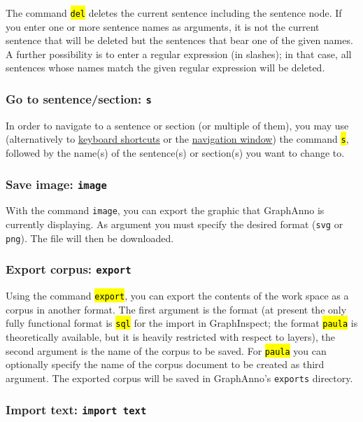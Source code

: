 \documentclass[12pt]{scrartcl}
\newcommand{\code}[1]{\hl{\texttt{#1}}}
\begin{document}
The command \code{del} deletes the current sentence including the sentence node.
If you enter one or more sentence names as arguments, it is not the current sentence that will be deleted but the sentences that bear one of the given names.
A further possibility is to enter a regular expression (in slashes); in that case, all sentences whose names match the given regular expression will be deleted.


\subsubsection{Go to sentence/section: \texttt{s}}\label{befehl-s}

In order to navigate to a sentence or section (or multiple of them), you may use (alternatively to \hyperref[shortcuts]{keyboard shortcuts} or the \hyperref[window-navigation]{navigation window}) the command \code{s}, followed by the name(s) of the sentence(s) or section(s) you want to change to.


\subsubsection{Save image: \texttt{image}}

With the command \texttt{image}, you can export the graphic that GraphAnno is currently displaying.
As argument you must specify the desired format (\texttt{svg} or \texttt{png}).
The file will then be downloaded.


\subsubsection{Export corpus: \texttt{export}}\label{befehl-export}

Using the command \code{export}, you can export the contents of the work space as a corpus in another format.
The first argument is the format (at present the only fully functional format is \code{sql} for the import in GraphInspect; the format \code{paula} is theoretically available, but it is heavily restricted with respect to layers), the second argument is the name of the corpus to be saved.
For \code{paula} you can optionally specify the name of the corpus document to be created as third argument.
The exported corpus will be saved in GraphAnno’s \texttt{exports} directory.


\subsubsection{Import text: \texttt{import text}}\label{befehl-import}
\end{document}

